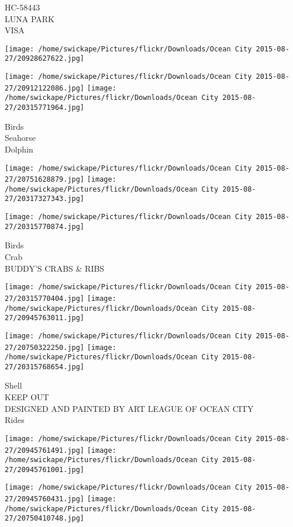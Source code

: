 \documentclass[10pt,letterpaper]{article}
\begin{document}
HC{-}58443\\
LUNA PARK\\
VISA
\pagebreak

\texttt{[image: /home/swickape/Pictures/flickr/Downloads/Ocean City 2015-08-27/20928627622.jpg]}

\vspace{0.25in}
\texttt{[image: /home/swickape/Pictures/flickr/Downloads/Ocean City 2015-08-27/20912122086.jpg]}
\texttt{[image: /home/swickape/Pictures/flickr/Downloads/Ocean City 2015-08-27/20315771964.jpg]}

Birds\\
Seahorse\\
Dolphin
\pagebreak

\texttt{[image: /home/swickape/Pictures/flickr/Downloads/Ocean City 2015-08-27/20751628879.jpg]}
\texttt{[image: /home/swickape/Pictures/flickr/Downloads/Ocean City 2015-08-27/20317327343.jpg]}

\vspace{0.25in}
\texttt{[image: /home/swickape/Pictures/flickr/Downloads/Ocean City 2015-08-27/20315770874.jpg]}

Birds\\
Crab\\
BUDDY'S CRABS \& RIBS
\pagebreak

\texttt{[image: /home/swickape/Pictures/flickr/Downloads/Ocean City 2015-08-27/20315770404.jpg]}
\texttt{[image: /home/swickape/Pictures/flickr/Downloads/Ocean City 2015-08-27/20945763011.jpg]}

\texttt{[image: /home/swickape/Pictures/flickr/Downloads/Ocean City 2015-08-27/20750322250.jpg]}
\texttt{[image: /home/swickape/Pictures/flickr/Downloads/Ocean City 2015-08-27/20315768654.jpg]}

Shell\\
KEEP OUT\\
DESIGNED AND PAINTED BY ART LEAGUE OF OCEAN CITY\\
Rides
\pagebreak

\texttt{[image: /home/swickape/Pictures/flickr/Downloads/Ocean City 2015-08-27/20945761491.jpg]}
\texttt{[image: /home/swickape/Pictures/flickr/Downloads/Ocean City 2015-08-27/20945761001.jpg]}

\texttt{[image: /home/swickape/Pictures/flickr/Downloads/Ocean City 2015-08-27/20945760431.jpg]}
\texttt{[image: /home/swickape/Pictures/flickr/Downloads/Ocean City 2015-08-27/20750410748.jpg]}
\end{document}
